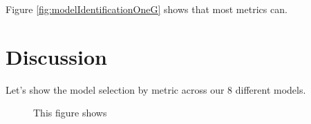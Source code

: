 \documentclass{article}\usepackage[]{graphicx}\usepackage[]{color}
\begin{document}
Figure \ref{fig:modelIdentificationOneG} shows that most metrics can.

\section{Discussion}

Let's show the model selection by metric across our 8 different models.



\begin{figure}
\caption{This figure shows }
\label{fig:modelIdentificationAll8}
\end{figure}
\end{document}
